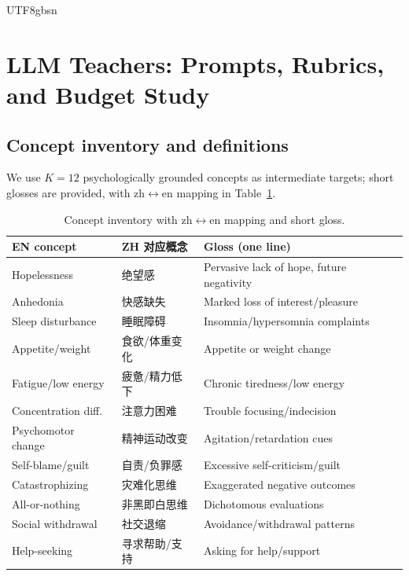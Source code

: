 \documentclass[acmsmall,natbib]{acmart}
\begin{document}
\begin{CJK*}{UTF8}{gbsn}

\section{LLM Teachers: Prompts, Rubrics, and Budget Study}
\label{app:teacher}

\subsection{Concept inventory and definitions}
\label{app:concepts}
We use $K{=}12$ psychologically grounded concepts as intermediate targets; short glosses are provided, with zh$\leftrightarrow$en mapping in Table~\ref{tab:concept-map}.

\begin{table}[h]
\centering
\caption{Concept inventory with zh$\leftrightarrow$en mapping and short gloss.}
\label{tab:concept-map}
\setlength{\tabcolsep}{3.5pt}
\begin{tabular}{lll}
\toprule
\textbf{EN concept} & \textbf{ZH 对应概念} & \textbf{Gloss (one line)} \\
\midrule
Hopelessness & 绝望感 & Pervasive lack of hope, future negativity \\
Anhedonia & 快感缺失 & Marked loss of interest/pleasure \\
Sleep disturbance & 睡眠障碍 & Insomnia/hypersomnia complaints \\
Appetite/weight & 食欲/体重变化 & Appetite or weight change \\
Fatigue/low energy & 疲惫/精力低下 & Chronic tiredness/low energy \\
Concentration diff. & 注意力困难 & Trouble focusing/indecision \\
Psychomotor change & 精神运动改变 & Agitation/retardation cues \\
Self-blame/guilt & 自责/负罪感 & Excessive self-criticism/guilt \\
Catastrophizing & 灾难化思维 & Exaggerated negative outcomes \\
All-or-nothing & 非黑即白思维 & Dichotomous evaluations \\
Social withdrawal & 社交退缩 & Avoidance/withdrawal patterns \\
Help-seeking & 寻求帮助/支持 & Asking for help/support \\
\bottomrule
\end{tabular}
\end{table}


\end{CJK*}
\end{document}

